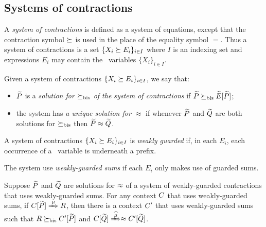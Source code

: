 \subsection{Systems of contractions}
\label{ss:SysContr}

A \emph{system of contractions} is defined as a system of equations,
except that the contraction symbol $\mathrel{\succeq}$ is used in the place of
the equality symbol $=$. Thus a system of contractions is a set 
$\{  X_i \mathrel{\succeq} E_i\}_{i\in I}$
where $I$ is an  indexing set and expressions
$E_i$  may contain the  \behavC\  variables 
$\{  X_i\}_{i\in I}$.

\begin{definition}
\label{d:uniContra}
Given a  system of contractions 
$\{  X_i \mathrel{\succeq} E_i\}_{i\in I}$, 
 we say that:
\begin{itemize}
\item
 $\widetilde P$ is a \emph{solution  for $\mathrel{\succeq_{\rm{bis}}}$ of the 
 system of contractions} 
 if $\widetilde P \mathrel{\succeq_{\rm{bis}}} \widetilde E [\widetilde P]$;
\item 
the system  
has  \emph{a unique 
solution for $\approx$}
if 
whenever 
 $\widetilde P$ and $\widetilde Q$ are both solutions  for  $\mathrel{\succeq_{\rm{bis}}}$
 then $\widetilde P \approx \widetilde Q$.
\end{itemize}
\end{definition}
  


\begin{definition}
\label{d:guarded}
A system of contractions $\{  X_i \mathrel{\succeq} E_i\}_{i\in I}$
 is
\emph{weakly guarded}
if,  in each    $E_i$, each occurrence of
a \behavC\ variable is underneath a prefix.

The system use \emph{weakly-guarded sums} if 
each $E_i$ only makes use of guarded sums.
\end{definition}



 
\begin{lemma}
\label{l:uptocon}
Suppose $\widetilde P$ and $\widetilde Q$ are solutions  for $\approx$
 of a system of weakly-guarded
contractions that uses  weakly-guarded sums.
For any context $C$ that uses  weakly-guarded sums, 
if  $\ct{\til P}\Arr{\mu}  R$,
 then 
there is a  context $C'$ that uses  weakly-guarded sums
such that $R \mathrel{\succeq_{\rm{bis}}} C' [\widetilde P]$ and  $\ct{\til Q} \Arcap{\mu}
 \wb \ctp{\til Q}$.
\end{lemma}


